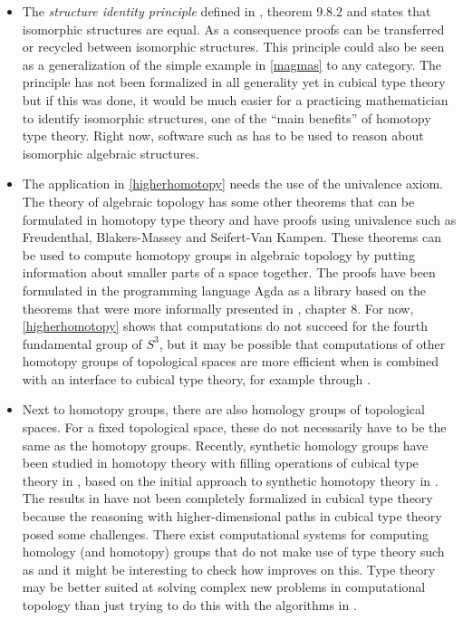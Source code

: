 \documentclass[12pt,a4paper,twoside,xetex]{book}
\newcommand{\keyword}[1]{\emph{#1}\index{#1}}
\begin{document}
\begin{itemize}
\item The \keyword{structure identity principle} defined in \cite{Voevodsky2013}, theorem 9.8.2 and \cite{Aczel2012} states that isomorphic structures are equal. As a consequence proofs can be transferred or recycled between isomorphic structures. This principle could also be seen as a generalization of the simple example in \cref{magmas} to any category. The principle has not been formalized in all generality yet in cubical type theory but if this was done, it would be much easier for a practicing mathematician to identify isomorphic structures, one of the ``main benefits'' of homotopy type theory. Right now, software such as \cite{TheGAPGroup2018} has to be used to reason about isomorphic algebraic structures.

\item The application in \cref{higherhomotopy} needs the use of the univalence axiom. The theory of algebraic topology has some other theorems that can be formulated in homotopy type theory and have proofs using univalence such as Freudenthal, Blakers-Massey and Seifert-Van Kampen. These theorems can be used to compute homotopy groups in algebraic topology by putting information about smaller parts of a space together. The proofs have been formulated in the programming language Agda as a library \cite{HoBr17} based on the theorems that were more informally presented in \cite{Voevodsky2013}, chapter 8. For now, \cref{higherhomotopy} shows that computations do not succeed for the fourth fundamental group of $S^3$, but it may be possible that computations of other homotopy groups of topological spaces are more efficient when \cite{HoBr17} is combined with an interface to cubical type theory, for example through \cite{Moertberg2018}.


\item Next to homotopy groups, there are also homology groups of topological spaces. For a fixed topological space, these do not necessarily have to be the same as the homotopy groups. Recently, synthetic homology groups have  been studied in homotopy theory with filling operations of cubical type theory in \cite{Graham2018}, based on the initial approach to synthetic homotopy theory in \cite{Licata2015}. The results in \cite{Graham2018} have not been completely formalized in cubical type theory because the reasoning with higher-dimensional paths in cubical type theory posed some challenges. There exist computational systems for computing homology  (and homotopy) groups that do not make use of type theory such as \cite{GaSeSi99} and it might be interesting to check how \cite{Graham2018} improves on this. Type theory may be better suited at solving complex new problems in computational topology than just trying to do this with the algorithms in \cite{GaSeSi99}.


\end{itemize}
\end{document}
